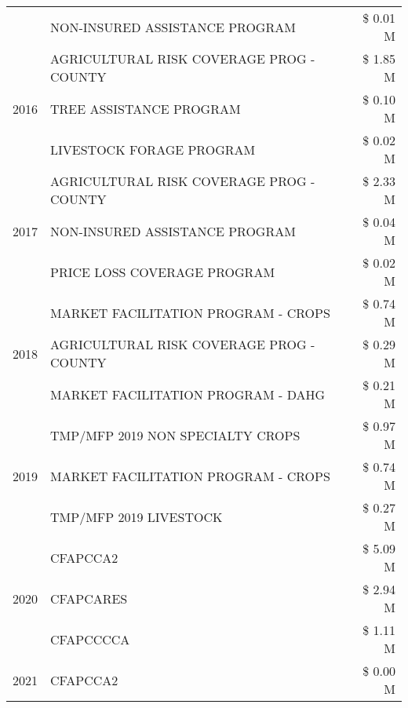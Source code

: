 \begin{tabular}{llr}
 & NON-INSURED ASSISTANCE PROGRAM & \$ 0.01 M \\
\cline{1-3}
\multirow[t]{3}{*}{2016} & AGRICULTURAL RISK COVERAGE PROG - COUNTY & \$ 1.85 M \\
 & TREE ASSISTANCE PROGRAM & \$ 0.10 M \\
 & LIVESTOCK FORAGE PROGRAM & \$ 0.02 M \\
\cline{1-3}
\multirow[t]{3}{*}{2017} & AGRICULTURAL RISK COVERAGE PROG - COUNTY & \$ 2.33 M \\
 & NON-INSURED ASSISTANCE PROGRAM & \$ 0.04 M \\
 & PRICE LOSS COVERAGE PROGRAM & \$ 0.02 M \\
\cline{1-3}
\multirow[t]{3}{*}{2018} & MARKET FACILITATION PROGRAM - CROPS & \$ 0.74 M \\
 & AGRICULTURAL RISK COVERAGE PROG - COUNTY & \$ 0.29 M \\
 & MARKET FACILITATION PROGRAM - DAHG & \$ 0.21 M \\
\cline{1-3}
\multirow[t]{3}{*}{2019} & TMP/MFP 2019 NON SPECIALTY CROPS & \$ 0.97 M \\
 & MARKET FACILITATION PROGRAM - CROPS & \$ 0.74 M \\
 & TMP/MFP 2019 LIVESTOCK & \$ 0.27 M \\
\cline{1-3}
\multirow[t]{3}{*}{2020} & CFAPCCA2 & \$ 5.09 M \\
 & CFAPCARES & \$ 2.94 M \\
 & CFAPCCCCA & \$ 1.11 M \\
\cline{1-3}
2021 & CFAPCCA2 & \$ 0.00 M \\
\cline{1-3}
\bottomrule
\end{tabular}
